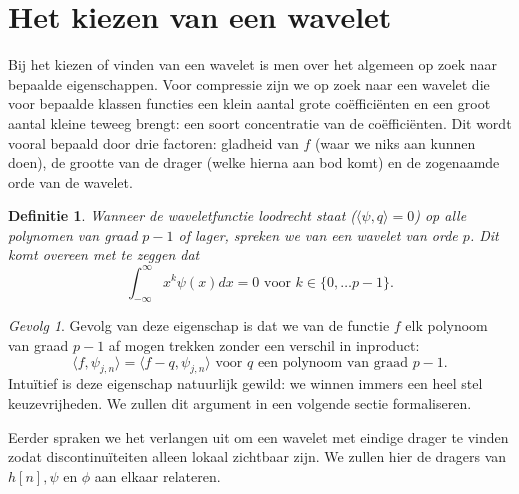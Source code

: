 \documentclass[11pt]{report}
\theoremstyle{plain}
\newtheorem*{definitie}{Definitie}
\theoremstyle{remark}
\newtheorem*{gevolg}{Gevolg}
\begin{document}
\section{Het kiezen van een wavelet}
Bij het kiezen of vinden van een wavelet is men over het algemeen op zoek naar bepaalde eigenschappen. Voor compressie zijn we op zoek naar een wavelet die voor bepaalde klassen functies een klein aantal grote co\"effici\"enten en een groot aantal kleine teweeg brengt: een soort concentratie van de co\"effici\"enten. Dit wordt vooral bepaald door drie factoren: gladheid van $f$ (waar we niks aan kunnen doen), de grootte van de drager (welke hierna aan bod komt) en de zogenaamde orde van de wavelet.

\begin{definitie}
Wanneer de waveletfunctie loodrecht staat ($\langle \psi, q\rangle = 0$) op alle polynomen van graad $p-1$ of lager, spreken we van een wavelet van orde $p$. Dit komt overeen met te zeggen dat
\[
	\int_{-\infty}^\infty x^k \psi(x) dx = 0 \text{ voor } k \in \{ 0, \ldots p-1 \}.
\]
\end{definitie}

\begin{gevolg}
Gevolg van deze eigenschap is dat we van de functie $f$ elk polynoom van graad $p-1$ af mogen trekken zonder een verschil in inproduct:
\[
	\langle f, \psi_{j,n} \rangle = \langle f - q, \psi_{j,n} \rangle \text{ voor $q$ een polynoom van graad $p-1$}. 
\]
Intu\"itief is deze eigenschap natuurlijk gewild: we winnen immers een heel stel keuzevrijheden. We zullen dit argument in een volgende sectie formaliseren.
\end{gevolg}

Eerder spraken we het verlangen uit om een wavelet met eindige drager te vinden zodat discontinu\"iteiten alleen lokaal zichtbaar zijn. We zullen hier de dragers van $h[n], \psi$ en $\phi$ aan elkaar relateren.
\end{document}
